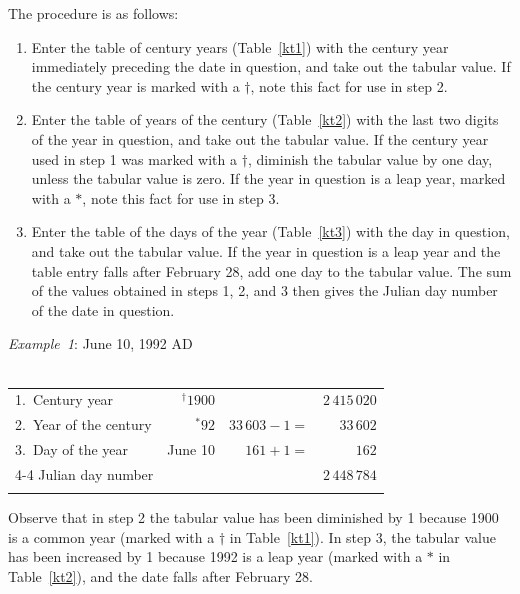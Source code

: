 The procedure is as follows:
\begin{enumerate}
\item Enter the table of century years (Table~\ref{kt1}) with the century
year immediately preceding the  date in question, and take out the tabular
value. If the
century year is marked with a $\dag$, note this fact for use in step 2.
\item Enter the table of years of the century (Table~\ref{kt2}) with the
last two digits of the year in question, and take out the tabular value.
If the century year used in step 1 was marked with a $\dag$, diminish the tabular value
by one day, unless the tabular value is zero. If the year in question
is a leap year,  marked with a $\ast$, note this fact for use in step 3.

\item Enter the table of the days of the year (Table~\ref{kt3}) with the
day in question, and take out the tabular value. If the year in question
is a leap year and the table entry falls after February 28, add
one day to the tabular value. The sum of the values obtained
in steps 1, 2, and 3 then gives the Julian day number of the date in question.
\end{enumerate}

\clearpage
\begin{center}
 {\em Example~1}: June 10, 1992 AD\\
~\\
\begin{tabular}{lrrr}
1.~Century year & $^\dag1900$ &&$2\,415\,020$\\
2.~Year of the century & $^\ast92$ & $33\,603 - 1 =$& $33\,602$\\
3.~Day of the year & June 10 & $161+1 =$ & $162$\\\cline{4-4}
Julian day number&&&$2\,448\,784$\\
&&&\\
\end{tabular}
\end{center}
Observe that in step 2 the tabular value has been diminished by 1 because 1900
is a common year (marked with a $\dag$ in Table~\ref{kt1}). In step 3, the
tabular value has been increased by 1 because 1992 is a leap year (marked with a $\ast$ in Table~\ref{kt2}), and the
date falls after February 28.

